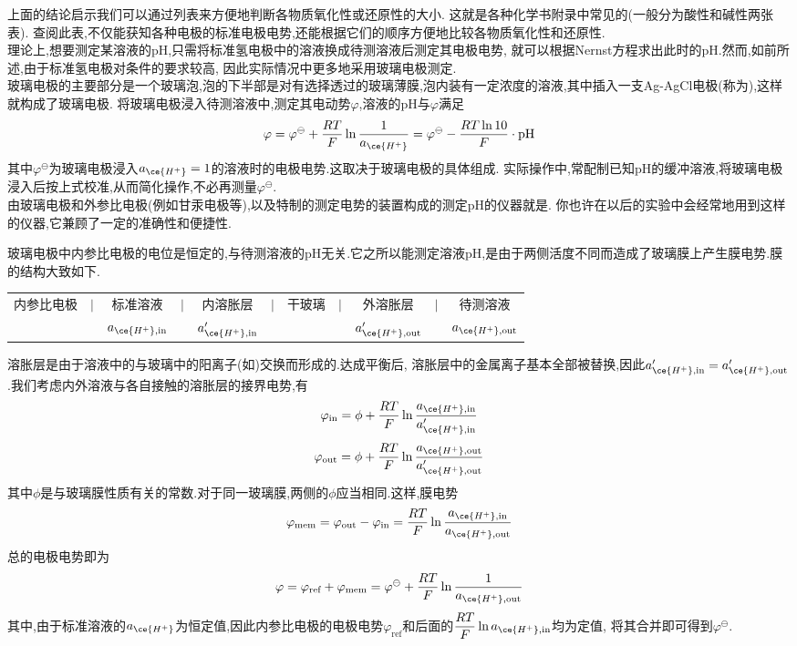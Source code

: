 \documentclass{ctexart}
\begin{document}
\indent 上面的结论启示我们可以通过列表来方便地判断各物质氧化性或还原性的大小.%
这就是各种化学书附录中常见的(一般分为酸性和碱性两张表).%
查阅此表,不仅能获知各种电极的标准电极电势,还能根据它们的顺序方便地比较各物质氧化性和还原性.\vspace{4pt}\\
\indent 理论上,想要测定某溶液的pH,只需将标准氢电极中的溶液换成待测溶液后测定其电极电势,%
就可以根据Nernst方程求出此时的pH.然而,如前所述,由于标准氢电极对条件的要求较高,
因此实际情况中更多地采用玻璃电极测定.\\
\indent 玻璃电极的主要部分是一个玻璃泡,泡的下半部是对有选择透过的玻璃薄膜,泡内装有一定浓度的溶液,其中插入一支Ag-AgCl电极(称为),这样就构成了玻璃电极.%
将玻璃电极浸入待测溶液中,测定其电动势$\varphi$,溶液的pH与$\varphi$满足
\[\varphi=\varphi^\ominus+\dfrac{RT}{F}\ln\dfrac{1}{a_{\ce{H^+}}}=\varphi^\ominus-\dfrac{RT\ln10}{F}\cdot\text{pH}\]
其中$\varphi^\ominus$为玻璃电极浸入$a_{\ce{H^+}}=1$的溶液时的电极电势.这取决于玻璃电极的具体组成.%
实际操作中,常配制已知pH的缓冲溶液,将玻璃电极浸入后按上式校准,从而简化操作,不必再测量$\varphi^\ominus$.\\
\indent 由玻璃电极和外参比电极(例如甘汞电极等),以及特制的测定电势的装置构成的测定pH的仪器就是.%
你也许在以后的实验中会经常地用到这样的仪器,它兼顾了一定的准确性和便捷性.\\
\begin{derivation}
    玻璃电极中内参比电极的电位是恒定的,与待测溶液的pH无关.它之所以能测定溶液pH,是由于两侧活度不同而造成了玻璃膜上产生膜电势.膜的结构大致如下.
    \vspace{-5pt}\begin{table}[H]\centering
        \begin{tabular}{ccccccccccc}
            内参比电极 &$\vert$ &标准溶液   &$\vert$ &内溶胀层 &$\vert$    &干玻璃 &$\vert$    &外溶胀层    &$\vert$    &待测溶液\\
            &&$a_{\ce{H^+},\text{in}}$ &&$a_{\ce{H^+},\text{in}}'$&&&&$a_{\ce{H^+},\text{out}}'$&&$a_{\ce{H^+},\text{out}}$
        \end{tabular}
    \end{table}\vspace{-15pt}
    溶胀层是由于溶液中的与玻璃中的阳离子(如)交换而形成的.达成平衡后,%
    溶胀层中的金属离子基本全部被替换,因此$a_{\ce{H^+},\text{in}}'=a_{\ce{H^+},\text{out}}'$.我们考虑内外溶液与各自接触的溶胀层的接界电势,有
    \[\varphi_{\text{in}}=\phi+\dfrac{RT}{F}\ln\dfrac{a_{\ce{H^+},\text{in}}}{a_{\ce{H^+},\text{in}}'}\]
    \[\varphi_{\text{out}}=\phi+\dfrac{RT}{F}\ln\dfrac{a_{\ce{H^+},\text{out}}}{a_{\ce{H^+},\text{out}}'}\]
    其中$\phi$是与玻璃膜性质有关的常数.对于同一玻璃膜,两侧的$\phi$应当相同.这样,膜电势
    \[\varphi_{\text{mem}}=\varphi_{\text{out}}-\varphi_{\text{in}}=\dfrac{RT}{F}\ln\dfrac{a_{\ce{H^+},\text{in}}}{a_{\ce{H^+},\text{out}}}\]
    总的电极电势即为
    \[\varphi=\varphi_{\text{ref}}+\varphi_{\text{mem}}=\varphi^\ominus+\dfrac{RT}{F}\ln\dfrac{1}{a_{\ce{H^+},\text{out}}}\]
    其中,由于标准溶液的$a_{\ce{H^+}}$为恒定值,因此内参比电极的电极电势$\varphi_{\text{ref}}$和后面的$\dfrac{RT}{F}\ln a_{\ce{H^+},\text{in}}$均为定值,%
    将其合并即可得到$\varphi^\ominus$.
\end{derivation}
\end{document}

